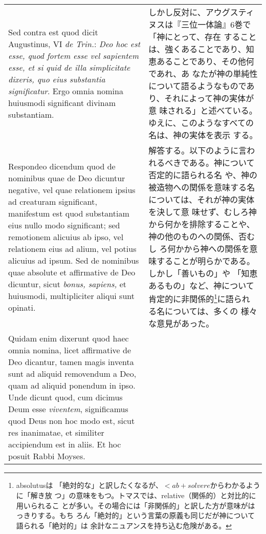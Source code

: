 \documentclass[10pt]{jsarticle}
\begin{document}
\begin{longtable}{p{21em}p{21em}}
\\

{\sc Sed contra est} quod dicit Augustinus, VI {\it de Trin.}: {\it
Deo hoc est esse, quod fortem esse vel sapientem esse, et si quid de
illa simplicitate dixeris, quo eius substantia significatur}. Ergo
omnia nomina huiusmodi significant divinam substantiam.

&

しかし反対に、アウグスティヌスは『三位一体論』6巻で「神にとって、存在
することは、強くあることであり、知恵あることであり、その他何であれ、あ
なたが神の単純性について語るようなものであり、それによって神の実体が意
味される」と述べている。ゆえに、このようなすべての名は、神の実体を表示
する。

\\

{\sc Respondeo dicendum} quod de nominibus quae de Deo dicuntur
negative, vel quae relationem ipsius ad creaturam significant,
manifestum est quod substantiam eius nullo modo significant; sed
remotionem alicuius ab ipso, vel relationem eius ad alium, vel potius
alicuius ad ipsum. Sed de nominibus quae absolute et affirmative de
Deo dicuntur, sicut {\it bonus, sapiens,} et huiusmodi, multipliciter
aliqui sunt opinati.

&

解答する。以下のように言われるべきである。神について否定的に語られる名
や、神の被造物への関係を意味する名については、それが神の実体を決して意
味せず、むしろ神から何かを排除することや、神の他のものへの関係、否むし
ろ何かから神への関係を意味することが明らかである。しかし「善いもの」や
「知恵あるもの」など、神について肯定的に非関係的\footnote{absolutusは
「絶対的な」と訳したくなるが、$< ab + solvere$からわかるように「解き放
つ」の意味をもつ。トマスでは、relative（関係的）と対比的に用いられるこ
とが多い。その場合には「非関係的」と訳した方が意味がはっきりする。もち
ろん「絶対的」という言葉の原義も同じだが神について語られる「絶対的」は
余計なニュアンスを持ち込む危険がある。}に語られる名については、多くの
様々な意見があった。

\\

Quidam enim dixerunt quod haec omnia nomina, licet affirmative
de Deo dicantur, tamen magis inventa sunt ad aliquid removendum a Deo,
quam ad aliquid ponendum in ipso. Unde dicunt quod, cum dicimus Deum
esse {\it viventem}, significamus quod Deus non hoc modo est, sicut res
inanimatae, et similiter accipiendum est in aliis. Et hoc posuit Rabbi
Moyses. 

&


\end{longtable}
\end{document}
